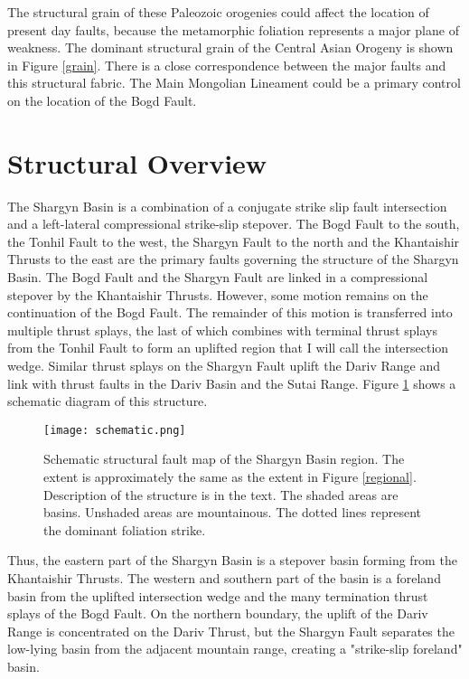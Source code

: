 \documentclass[10pt,a4paper]{article}
\begin{document}
The structural grain of these Paleozoic orogenies could affect the location of present day faults, because the metamorphic foliation represents a major plane of weakness. The dominant structural grain of the Central Asian Orogeny is shown in Figure \ref{grain}. There is a close correspondence between the major faults and this structural fabric. The Main Mongolian Lineament could be a primary control on the location of the Bogd Fault.

\clearpage
\section{Structural Overview}
The Shargyn Basin is a combination of a conjugate strike slip fault intersection and a left-lateral compressional strike-slip stepover. The Bogd Fault to the south, the Tonhil Fault to the west, the Shargyn Fault to the north and the Khantaishir Thrusts to the east are the primary faults governing the structure of the Shargyn Basin. The Bogd Fault and the Shargyn Fault are linked in a compressional stepover by the Khantaishir Thrusts. However, some motion remains on the continuation of the Bogd Fault. The remainder of this motion is transferred into multiple thrust splays, the last of which combines with terminal thrust splays from the Tonhil Fault to form an uplifted region that I will call the intersection wedge. Similar thrust splays on the Shargyn Fault uplift the Dariv Range and link with thrust faults in the Dariv Basin and the Sutai Range. Figure \ref{schematic} shows a schematic diagram of this structure.

\begin{figure}[h!]
  \centering
  \texttt{[image: schematic.png]}
  \caption{Schematic structural fault map of the Shargyn Basin region. The extent is approximately the same as the extent in Figure \ref{regional}. Description of the structure is in the text. The shaded areas are basins. Unshaded areas are mountainous. The dotted lines represent the dominant foliation strike.}
  \label{schematic}
\end{figure}

	Thus, the eastern part of the Shargyn Basin is a stepover basin forming from the Khantaishir Thrusts. The western and southern part of the basin is a foreland basin from the uplifted intersection wedge and the many termination thrust splays of the Bogd Fault. On the northern boundary, the uplift of the Dariv Range is concentrated on the Dariv Thrust, but the Shargyn Fault separates the low-lying basin from the adjacent mountain range, creating a "strike-slip foreland" basin.
\end{document}
